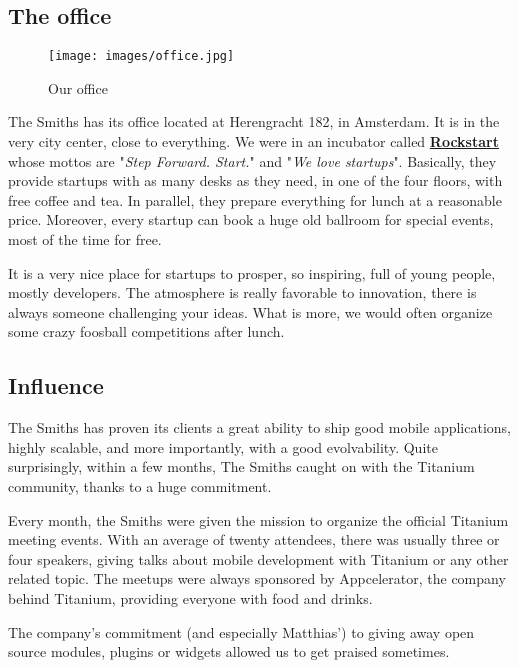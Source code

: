 \subsection{The office}

\begin{figure}[H]
   \centering\texttt{[image: images/office.jpg]}
   \caption[Our office]{Our office}
\end{figure}

The Smiths has its office located at Herengracht 182, in Amsterdam. It is in the very city center, close to everything. We were in an incubator called \textbf{\href{http://www.rockstart.com/}{Rockstart}} whose mottos are "\textit{Step Forward. Start.}" and "\textit{We love startups}". Basically, they provide startups with as many desks as they need, in one of the four floors, with free coffee and tea. In parallel, they prepare everything for lunch at a reasonable price. Moreover, every startup can book a huge old ballroom for special events, most of the time for free.

\medskip

It is a very nice place for startups to prosper, so inspiring, full of young people, mostly developers. The atmosphere is really favorable to innovation, there is always someone challenging your ideas. What is more, we would often organize some crazy foosball competitions after lunch.

\subsection{Influence}

The Smiths has proven its clients a great ability to ship good mobile applications, highly scalable, and more importantly, with a good evolvability. Quite surprisingly, within a few months, The Smiths caught on with the Titanium community, thanks to a huge commitment.

\medskip

Every month, the Smiths were given the mission to organize the official Titanium meeting events. With an average of twenty attendees, there was usually three or four speakers, giving talks about mobile development with Titanium or any other related topic. The meetups were always sponsored by Appcelerator, the company behind Titanium, providing everyone with food and drinks.

\medskip

The company's commitment (and especially Matthias') to giving away open source modules, plugins or widgets allowed us to get praised sometimes.


